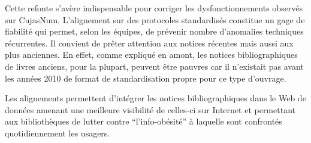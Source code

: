 Cette refonte s'avère indispensable pour corriger les dysfonctionnements observés sur CujasNum. L'alignement sur des protocoles standardisés constitue un gage de fiabilité qui permet, selon les équipes, de prévenir nombre d'anomalies techniques récurrentes. Il convient de prêter attention aux notices récentes mais aussi aux plus anciennes. En effet, comme expliqué en amont, les notices bibliographiques de livres anciens, pour la plupart, peuvent être pauvres car il n'existait pas avant les années 2010 de format de standardisation propre pour ce type d'ouvrage.

Les alignements permettent d'intégrer les notices bibliographiques dans le Web de données amenant une meilleure visibilité de celles-ci sur Internet et permettant aux bibliothèques de lutter contre \enquote{l'info-obésité} à laquelle sont confrontés quotidiennement les usagers. 
